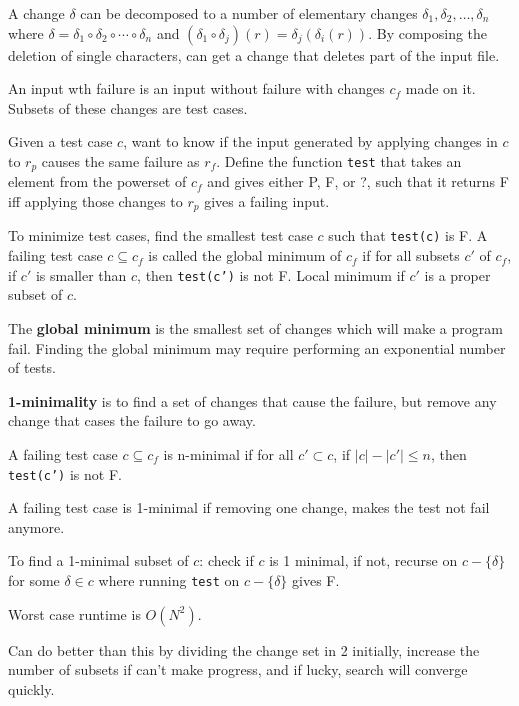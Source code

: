 \documentclass[11pt]{article}
\begin{document}
A change \(\delta\) can be decomposed to a number of elementary changes
\(\delta_{1}, \delta_{2}, \dots, \delta_{n}\) where
\(\delta = \delta_{1} \circ \delta_{2} \circ \cdots \circ \delta_{n}\) and
\((\delta_{1} \circ \delta_{j})(r) = \delta_{j}(\delta_{i}(r))\).
By composing the deletion of single characters, can get a change that deletes part of the input
file.

An input wth failure is an input without failure with changes \(c_{f}\) made on it.
Subsets of these changes are test cases.

Given a test case \(c\), want to know if the input generated by applying changes in \(c\) to \(r_{p}\)
causes the same failure as \(r_{f}\).
Define the function \texttt{test} that takes an element from the powerset of \(c_{f}\) and gives
either P, F, or ?, such that it returns F iff applying those changes to \(r_{p}\) gives a failing input.

To minimize test cases, find the smallest test case \(c\) such that \texttt{test(c)} is F.
A failing test case \(c \subseteq c_{f}\) is called the global minimum of \(c_{f}\) if
for all subsets \(c'\) of \(c_{f}\), if \(c'\) is smaller than \(c\), then \texttt{test(c')} is not F.
Local minimum if \(c'\) is a proper subset of \(c\).

The \textbf{global minimum} is the smallest set of changes which will make a program fail.
Finding the global minimum may require performing an exponential number of tests.

\textbf{1-minimality} is to find a set of changes that cause the failure, but remove any change that cases
the failure to go away.

A failing test case \(c \subseteq c_{f}\) is n-minimal if for all \(c' \subset c\), if \(|c| - |c'| \le n\),
then \texttt{test(c')} is not F.

A failing test case is 1-minimal if removing one change, makes the test not fail anymore.

To find a 1-minimal subset of \(c\): check if \(c\) is 1 minimal, if not, recurse on
\(c - \{\delta\}\) for some \(\delta \in c\) where running \texttt{test} on \(c - \{\delta\}\) gives F.

Worst case runtime is \(O(N^{2})\).

Can do better than this by dividing the change set in 2 initially, increase the number of subsets if
can't make progress, and if lucky, search will converge quickly.
\end{document}
